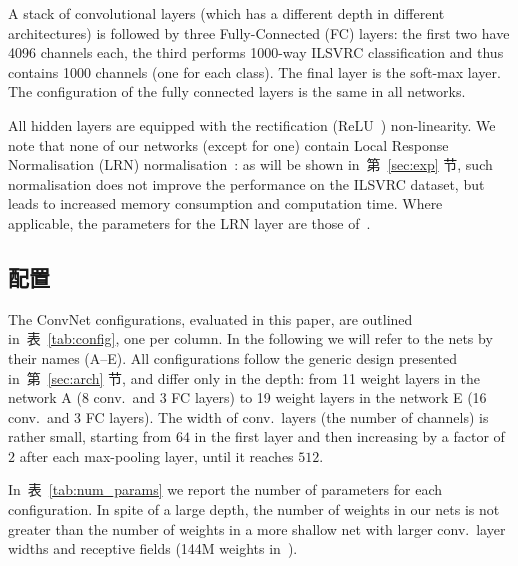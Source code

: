 \documentclass{article} %
\newcommand{\tblref}[1]{表~\ref{#1}}
\newcommand{\sref}[1]{第~\ref{#1} 节}
\begin{document}
A stack of convolutional layers (which has a different depth in different architectures) is followed by three Fully-Connected (FC) layers: the first
two have 4096 channels each, the third performs 1000-way ILSVRC classification and thus contains 1000 channels (one for each class). The final layer is the soft-max layer.
The configuration of the fully connected layers is the same in all networks. 

All hidden layers are equipped with the rectification (ReLU~\citep{Krizhevsky12}) non-linearity. 
We note that none of our networks (except for one) contain Local Response Normalisation (LRN) normalisation~\citep{Krizhevsky12}: as will be shown in~\sref{sec:exp}, such normalisation 
does not improve the performance on the ILSVRC dataset, but leads to increased memory consumption and computation time. 
Where applicable, the parameters for the LRN layer are those of~\citep{Krizhevsky12}.

\subsection{配置}
\label{sec:config}
The ConvNet configurations, evaluated in this paper, are outlined in~\tblref{tab:config}, one per column. In the following we will refer to the nets by their names 
(A--E). All configurations follow the generic design presented in~\sref{sec:arch}, and differ only in the depth: 
from 11 weight layers in the network A (8 conv.\ and 3 FC layers) to 19 weight layers in the network E (16 conv.\ and 3 FC layers).
The width of conv.\ layers (the number of channels) is rather small, starting from $64$ in the first layer and then increasing by a factor of $2$ after each max-pooling layer,
until it reaches $512$.

In~\tblref{tab:num_params} we report the number of parameters for each configuration.
In spite of a large depth, the number of weights in our nets is not greater than the number of weights in a more shallow net with larger conv.\ layer widths and receptive fields
(144M weights in~\citep{Sermanet14}).
\end{document}
